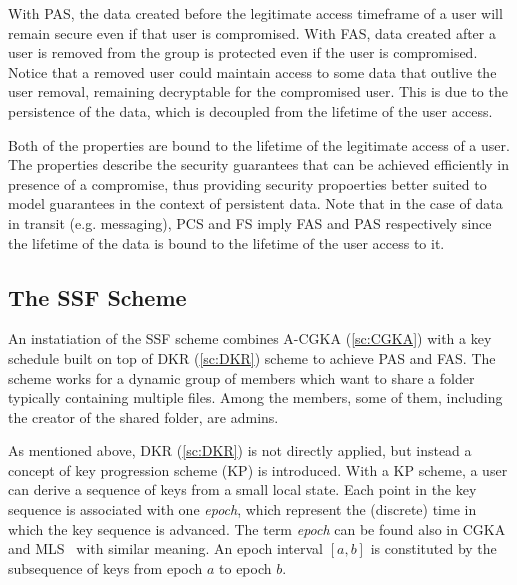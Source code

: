 With PAS, the data created before the legitimate access timeframe of a user
will remain secure even if that user is compromised.
With FAS, data created after a user is removed from the group is protected
even if the user is compromised. Notice that a removed user
could maintain access to some data that outlive the user removal,
remaining decryptable for the compromised user.
This is due to the persistence of the data, which is decoupled from the
lifetime of the user access.

Both of the properties are bound to the lifetime of the legitimate access 
of a user.
The properties describe the security guarantees that can be achieved efficiently
in presence of a compromise, thus providing security propoerties better 
suited to model guarantees in the context of persistent data.
Note that in the case of data in transit (e.g. messaging),
PCS and FS imply FAS and PAS respectively since the lifetime of the data
is bound to the lifetime of the user access to it.

\subsection{The SSF Scheme}

An instatiation of the SSF scheme combines A-CGKA (\cref{sc:CGKA}) with
a key schedule built on top of DKR (\cref{sc:DKR}) scheme 
to achieve PAS and FAS.
The scheme works for a dynamic group of members which want to share a folder
typically containing multiple files. Among the members, some of them,
including the creator of the shared folder, are admins.

As mentioned above, DKR (\cref{sc:DKR}) is not directly applied, 
but instead a concept of key progression scheme (KP) is introduced.
With a KP scheme, a user can derive a sequence of keys from a small local state. 
Each point in the key sequence is associated with one \textit{epoch}, 
which represent the (discrete) time in which the key sequence is advanced.
The term \textit{epoch} can be found also in CGKA and MLS~\cite{rfc9420} with similar meaning.
An epoch interval $[a, b]$ is constituted by the subsequence of keys
from epoch $a$ to epoch $b$.

